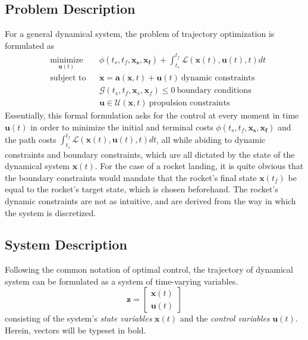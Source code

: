 \documentclass{article}
\begin{document}
\subsection{Problem Description}
For a general dynamical system, the problem of trajectory optimization is formulated as
\begin{equation*}
\begin{aligned}
& \underset{\mathbf{u}(t)}{\text{minimize}}
& & \phi(t_s,t_f,\mathbf{x_s},\mathbf{x_f}) + \int^{t_f}_{t_s} \mathcal{L}(\mathbf{x}(t),\mathbf{u}(t), t)dt\\
& \text{subject to}
& & \dot{\mathbf{x}} = \mathbf{a}(\mathbf{x},t) + \mathbf{u}(t)~\text{dynamic constraints}\\
&&& \mathcal{G}(t_s,t_f,\mathbf{x}_s,\mathbf{x}_f)\leq0 ~ \text{boundary conditions} \\
&&& \mathbf{u} \in \mathcal{U}(\mathbf{x},t) ~ \text{propulsion constraints}
\end{aligned}
\end{equation*}
Essentially, this formal formulation asks for the control at every moment in time $\mathbf{u}(t)$ in order to minimize the initial and terminal costs $\phi(t_s,t_f,\mathbf{x_s},\mathbf{x_f})$ and the path costs $\int^{t_f}_{t_s} \mathcal{L}(\mathbf{x}(t),\mathbf{u}(t), t)dt$, all while abiding to dynamic constraints and boundary constraints, which are all dictated by the state of the dynamical system $\mathbf{x}(t)$. For the case of a rocket landing, it is quite obvious that the boundary constraints would mandate that the rocket's final state $\mathbf{x}(t_f)$ be equal to the rocket's target state, which is chosen beforehand. The rocket's dynamic constraints are not as intuitive, and are derived from the way in which the system is discretized.

\subsection{System Description}
Following the common notation of optimal control, the trajectory of dynamical system can be formulated as a system of time-varying variables.
$$
\mathbf{z} = 
\begin{bmatrix}
\mathbf{x}(t) \\
\mathbf{u}(t)
\end{bmatrix}
$$
consisting of the system's \textit{state variables} $\mathbf{x}(t)$ and the \textit{control variables} $\mathbf{u}(t)$. Herein, vectors will be typeset in bold.
\end{document}
